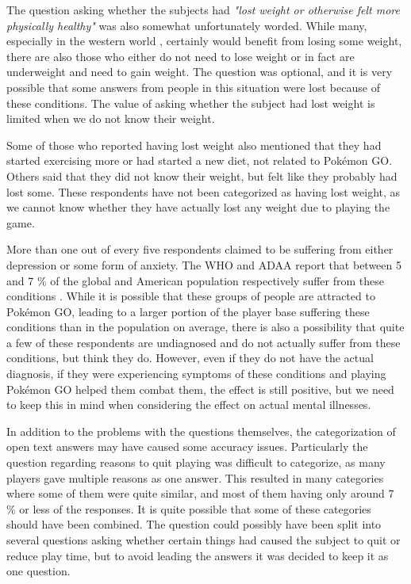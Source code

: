 The question asking whether the subjects had \emph{"lost weight or otherwise felt more physically healthy"} was also somewhat unfortunately worded. While many, especially in the western world , certainly would benefit from losing some weight, there are also those who either do not need to lose weight or in fact are underweight and need to gain weight. The question was optional, and it is very possible that some answers from people in this situation were lost because of these conditions. The value of asking whether the subject had lost weight is limited when we do not know their weight.

Some of those who reported having lost weight also mentioned that they had started exercising more or had started a new diet, not related to Pokémon GO. Others said that they did not know their weight, but felt like they probably had lost some. These respondents have not been categorized as having lost weight, as we cannot know whether they have actually lost any weight due to playing the game.

More than one out of every five respondents claimed to be suffering from either depression or some form of anxiety. The WHO and ADAA report that between 5 and 7 \% of the global and American population respectively suffer from these conditions . While it is possible that these groups of people are attracted to Pokémon GO, leading to a larger portion of the player base suffering these conditions than in the population on average, there is also a possibility that quite a few of these respondents are undiagnosed and do not actually suffer from these conditions, but think they do. However, even if they do not have the actual diagnosis, if they were experiencing symptoms of these conditions and playing Pokémon GO helped them combat them, the effect is still positive, but we need to keep this in mind when considering the effect on actual mental illnesses.

In addition to the problems with the questions themselves, the categorization of open text answers may have caused some accuracy issues. Particularly the question regarding reasons to quit playing was difficult to categorize, as many players gave multiple reasons as one answer. This resulted in many categories where some of them were quite similar, and most of them having only around 7 \% or less of the responses. It is quite possible that some of these categories should have been combined. The question could possibly have been split into several questions asking whether certain things had caused the subject to quit or reduce play time, but to avoid leading the answers it was decided to keep it as one question.


